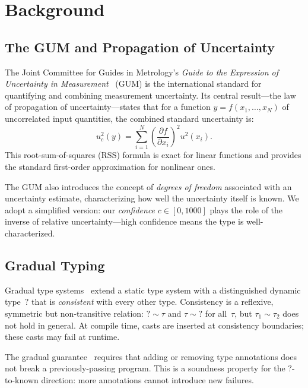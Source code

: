 \documentclass[acmsmall,screen,review,anonymous]{acmart}
\begin{document}
\section{Background}
\label{sec:background}

\subsection{The GUM and Propagation of Uncertainty}

The Joint Committee for Guides in Metrology's \emph{Guide to the
Expression of Uncertainty in Measurement}~\cite{jcgm2008gum} (GUM)
is the international standard for quantifying and combining measurement
uncertainty.
Its central result---the law of propagation of uncertainty---states that
for a function $y = f(x_1, \ldots, x_N)$ of uncorrelated input quantities,
the combined standard uncertainty is:
\begin{equation}
u_c^2(y) = \sum_{i=1}^{N} \left(\frac{\partial f}{\partial x_i}\right)^2 u^2(x_i).
\label{eq:gum-lpu}
\end{equation}
This root-sum-of-squares (RSS) formula is exact for linear functions and
provides the standard first-order approximation for nonlinear ones.

The GUM also introduces the concept of \emph{degrees of freedom}
associated with an uncertainty estimate, characterizing how well the
uncertainty itself is known.
We adopt a simplified version: our \emph{confidence} $c \in [0, 1000]$
plays the role of the inverse of relative uncertainty---high confidence
means the type is well-characterized.

\subsection{Gradual Typing}

Gradual type systems~\cite{siek2006gradual} extend a static type system
with a distinguished dynamic type~$?$ that is \emph{consistent} with
every other type.
Consistency is a reflexive, symmetric but non-transitive relation:
$? \sim \tau$ and $\tau \sim ?$ for all~$\tau$, but $\tau_1 \sim \tau_2$
does not hold in general.
At compile time, casts are inserted at consistency boundaries;
these casts may fail at runtime.

The gradual guarantee~\cite{siek2015refined} requires that adding or
removing type annotations does not break a previously-passing program.
This is a soundness property for the $?$-to-known direction:
more annotations cannot introduce new failures.
\end{document}
